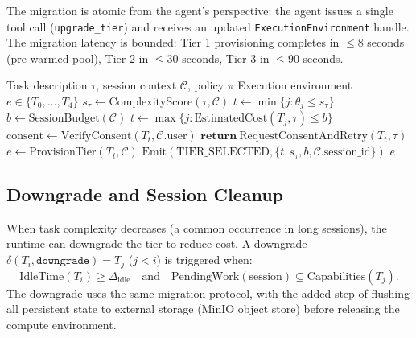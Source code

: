 \documentclass[11pt]{article}
\begin{document}
The migration is atomic from the agent's perspective: the agent issues a
single tool call (\texttt{upgrade\_tier}) and receives an updated
\texttt{ExecutionEnvironment} handle. The migration latency is bounded:
Tier 1 provisioning completes in $\leq 8$ seconds (pre-warmed pool),
Tier 2 in $\leq 30$ seconds, Tier 3 in $\leq 90$ seconds.

\begin{algorithm}[H]
\caption{Adaptive Tier Selection}
\label{alg:tier}
\begin{algorithmic}[1]
\Require Task description $\tau$, session context $\mathcal{C}$, policy $\pi$
\Ensure Execution environment $e \in \{T_0, \ldots, T_4\}$
\State $s_\tau \gets \text{ComplexityScore}(\tau, \mathcal{C})$
\State $t \gets \min\{j : \theta_j \leq s_\tau\}$
\State $b \gets \text{SessionBudget}(\mathcal{C})$
    \State $t \gets \max\{j : \text{EstimatedCost}(T_j, \tau) \leq b\}$
\EndIf
\State $\text{consent} \gets \text{VerifyConsent}(T_t, \mathcal{C}.\text{user})$
    \State $\textbf{return}\ \text{RequestConsentAndRetry}(T_t, \tau)$
\EndIf
\State $e \gets \text{ProvisionTier}(T_t, \mathcal{C})$
\State $\text{Emit}(\text{TIER\_SELECTED}, \{t, s_\tau, b, \mathcal{C}.\text{session\_id}\})$
\State \Return $e$
\end{algorithmic}
\end{algorithm}

\subsection{Downgrade and Session Cleanup}

When task complexity decreases (a common occurrence in long sessions), the
runtime can downgrade the tier to reduce cost. A downgrade $\delta(T_i,
\texttt{downgrade}) = T_j$ ($j < i$) is triggered when:
\begin{equation}
    \text{IdleTime}(T_i) \geq \Delta_{\text{idle}} \quad \text{and} \quad
    \text{PendingWork}(\text{session}) \subseteq \text{Capabilities}(T_j).
\end{equation}
The downgrade uses the same migration protocol, with the added step of
flushing all persistent state to external storage (MinIO object store) before
releasing the compute environment.

\end{document}

